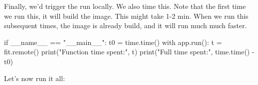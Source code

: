 \documentclass[
  letterpaper,
  DIV=11,
  numbers=noendperiod]{scrreprt}
\newenvironment{Shaded}{\begin{snugshade}}{\end{snugshade}}
\newcommand{\BuiltInTok}[1]{\textcolor[rgb]{0.00,0.23,0.31}{#1}}
\newcommand{\ControlFlowTok}[1]{\textcolor[rgb]{0.00,0.23,0.31}{#1}}
\newcommand{\NormalTok}[1]{\textcolor[rgb]{0.00,0.23,0.31}{#1}}
\newcommand{\OperatorTok}[1]{\textcolor[rgb]{0.37,0.37,0.37}{#1}}
\newcommand{\StringTok}[1]{\textcolor[rgb]{0.13,0.47,0.30}{#1}}
\newcommand{\VariableTok}[1]{\textcolor[rgb]{0.07,0.07,0.07}{#1}}
\begin{document}
Finally, we'd trigger the run locally. We also time this. Note that the
first time we run this, it will build the image. This might take 1-2
min. When we run this subsequent times, the image is already build, and
it will run much much faster.

\begin{Shaded}
\begin{Highlighting}[]
\ControlFlowTok{if} \VariableTok{\_\_name\_\_} \OperatorTok{==} \StringTok{"\_\_main\_\_"}\NormalTok{:}
\NormalTok{    t0 }\OperatorTok{=}\NormalTok{ time.time()}
    \ControlFlowTok{with}\NormalTok{ app.run():}
\NormalTok{        t }\OperatorTok{=}\NormalTok{ fit.remote()}
        \BuiltInTok{print}\NormalTok{(}\StringTok{"Function time spent:"}\NormalTok{, t)}
    \BuiltInTok{print}\NormalTok{(}\StringTok{"Full time spent:"}\NormalTok{, time.time() }\OperatorTok{{-}}\NormalTok{ t0)}
\end{Highlighting}
\end{Shaded}

Let's now run it all:
\end{document}
